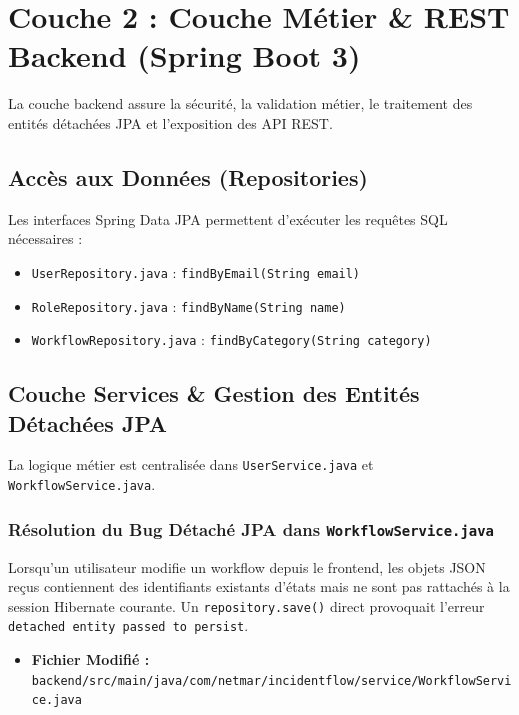 \documentclass[11pt,a4paper]{article}
\begin{document}
\section{Couche 2 : Couche Métier \& REST Backend (Spring Boot 3)}

La couche backend assure la sécurité, la validation métier, le traitement des entités détachées JPA et l'exposition des API REST.

\subsection{Accès aux Données (Repositories)}
Les interfaces Spring Data JPA permettent d'exécuter les requêtes SQL nécessaires :
\begin{itemize}
    \item \texttt{UserRepository.java} : \texttt{findByEmail(String email)}
    \item \texttt{RoleRepository.java} : \texttt{findByName(String name)}
    \item \texttt{WorkflowRepository.java} : \texttt{findByCategory(String category)}
\end{itemize}

\subsection{Couche Services \& Gestion des Entités Détachées JPA}
La logique métier est centralisée dans \texttt{UserService.java} et \texttt{WorkflowService.java}.

\subsubsection{Résolution du Bug Détaché JPA dans \texttt{WorkflowService.java}}
Lorsqu'un utilisateur modifie un workflow depuis le frontend, les objets JSON reçus contiennent des identifiants existants d'états mais ne sont pas rattachés à la session Hibernate courante. Un \texttt{repository.save()} direct provoquait l'erreur \texttt{detached entity passed to persist}.

\begin{itemize}
    \item \textbf{Fichier Modifié :} \texttt{backend/src/main/java/com/netmar/incidentflow/service/WorkflowService.java}
\end{itemize}
\end{document}
